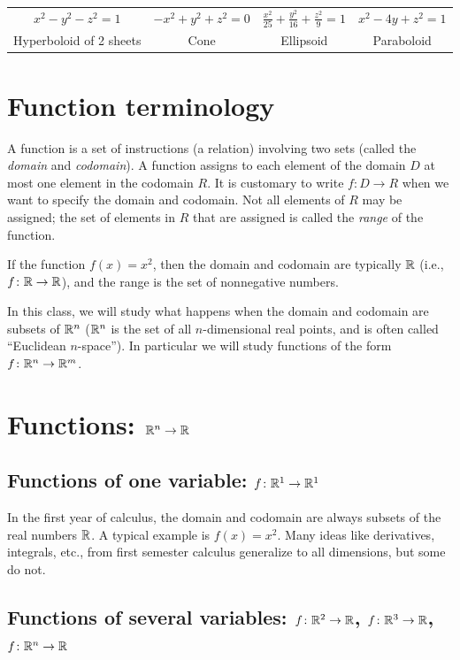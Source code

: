 \begin{center}
\begin{tabular}{cccc}
\\
$x^2-y^2-z^2=1$ &
$-x^2+y^2+z^2=0$ &
$\frac{x^2}{25}+\frac{y^2}{16}+\frac{z^2}{9}=1$ &
$x^2-4y+z^2=1$
\\
Hyperboloid of 2 sheets&
Cone &
Ellipsoid &
Paraboloid
\end{tabular}
\end{center}






\section{Function terminology}
A function is a set of instructions (a relation) involving two sets
(called the \emph{domain} and \emph{codomain}).  A function assigns to
each element of the domain $D$ at most one element in the codomain
$R$. It is customary to write {$f\colon D\to R$} when we want to
specify the domain and codomain.  Not all elements of $R$ may be
assigned; the set of elements in $R$ that are assigned is called the
\emph{range} of the function.

\begin{example}
  If the function $f(x)=x^2$, then the domain and codomain are typically
  $\mathbb{R}$ (i.e., $f\colon \mathbb{R} \to \mathbb{R}$), and the range is the set of nonnegative numbers.
\end{example}

In this class, we will study what happens when the domain and codomain
are subsets of {${\mathbb{R}}^n$} ($\mathbb{R}^n$ is the set of all $n$-dimensional
real points, and is often called ``Euclidean {$n$}-space''). In
particular we will study functions of the form $f\colon {\ensuremath{\mathbb{R}}}^n\to
{\ensuremath{\mathbb{R}}}^m$.

\section{Functions: $\mathbb{R}^n\to \mathbb{R}$}
\subsection{Functions of one variable: $f\colon \mathbb{R}^1\to  \mathbb{R}^1$}
In the first year of calculus, the domain and codomain are always
subsets of the real numbers {$\mathbb{R}$}.  A typical example is $f(x)=x^2$.
Many ideas like derivatives, integrals, etc., from first semester
calculus generalize to all dimensions, but some do not.

\subsection{Functions of several variables:  $f\colon \mathbb{R}^2\to \mathbb{R}$, $f\colon \mathbb{R}^3\to \mathbb{R}$, $f\colon \mathbb{R}^n\to \mathbb{R}$} 

